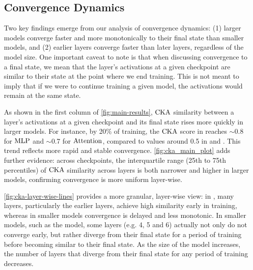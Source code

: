 \subsection{Convergence Dynamics}
\label{subsec:convergence-dynamics}

Two key findings emerge from our analysis of convergence dynamics: (1) larger models converge faster and more monotonically to their final state than smaller models, and (2) earlier layers converge faster than later layers, regardless of the model size. One important caveat to note is that when discussing convergence to a final state, we mean that the layer's activations at a given checkpoint are similar to their state at the point where we end training. This is not meant to imply that if we were to continue training a given model, the activations would remain at the same state. 

\clearpage

\begin{result} 
\label{result:cka}
    
As shown in the first column of \cref{fig:main-results}, $\mathrm{CKA}$ similarity between a layer's activations at a given checkpoint and its final state rises more quickly in larger models. For instance, by 20\% of training, the $\mathrm{CKA}$ score in \twobil reaches $\sim$0.8 for $\mathrm{MLP}$ and $\sim$0.7 for $\mathrm{Attention}$, compared to values around 0.5 in \sevenmil and \sixmil. This trend reflects more rapid and stable convergence. \cref{fig:cka_main_plot} adds further evidence: across checkpoints, the interquartile range (25th to 75th percentiles) of $\mathrm{CKA}$ similarity across layers is both narrower and higher in larger models, confirming convergence is more uniform layer-wise.

\cref{fig:cka-layer-wise-lines} provides a more granular, layer-wise view: in \twobil, many layers, particularly the earlier layers, achieve high similarity early in training, whereas in smaller models convergence is delayed and less monotonic. In smaller models, such as the \sevenmil model, some layers (e.g. 4, 5 and 6) actually not only do not converge early, but rather diverge from their final state for a period of training before becoming similar to their final state. As the size of the model increases, the number of layers that diverge from their final state for any period of training decreases.

\end{result}

